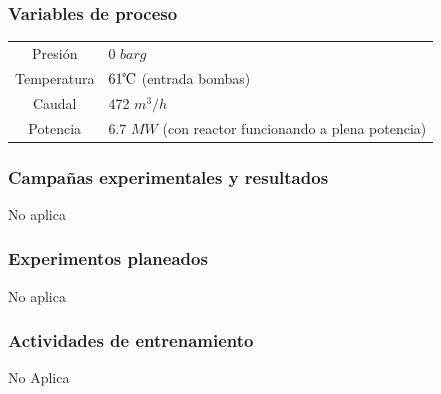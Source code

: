 \documentclass{article}
\begin{document}
\subsubsection*{Variables de proceso}
\begin{table}[H]
\centering
\begin{tabular}{cp{3.5cm}}
\toprule
Presión & 0 $barg$ \\
Temperatura & $61\celsius$ (entrada bombas) \\
Caudal & 472 $m^3/h$ \\
Potencia & $6.7$ $MW$ (con reactor funcionando a plena \newline potencia) \\
\bottomrule
\end{tabular}
\end{table}
\subsubsection*{Campañas experimentales y resultados}
No aplica
\subsubsection*{Experimentos planeados}
No aplica
\subsubsection*{Actividades de entrenamiento}
No Aplica
\end{document}
